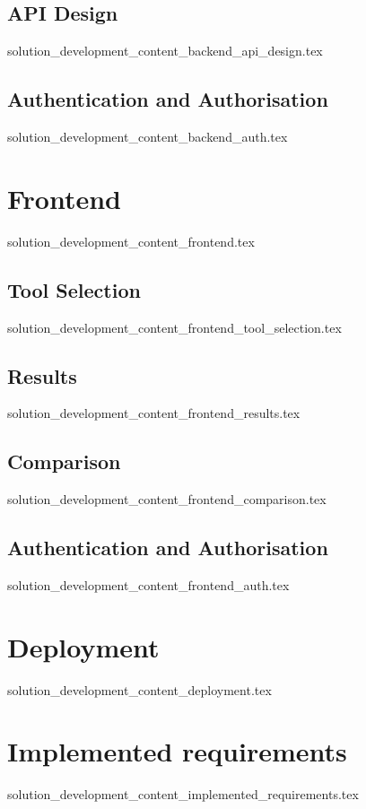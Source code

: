 \subsection{API Design}
  {solution_development_content_backend_api_design.tex}
\subsection{Authentication and Authorisation}\label{sub:backend_auth}
  {solution_development_content_backend_auth.tex}

\section{Frontend}\label{sub:frontend}
  {solution_development_content_frontend.tex}
\subsection{Tool Selection}\label{sub:frontend_tool_selection}
  {solution_development_content_frontend_tool_selection.tex}
\subsection{Results}\label{sub:frontend_results}
  {solution_development_content_frontend_results.tex}
\subsection{Comparison}\label{sub:frontend_comparison}
  {solution_development_content_frontend_comparison.tex}
\subsection{Authentication and Authorisation}\label{sub:frontend_auth}
  {solution_development_content_frontend_auth.tex}

\section{Deployment}
  {solution_development_content_deployment.tex}

\section{Implemented requirements}
  {solution_development_content_implemented_requirements.tex}
